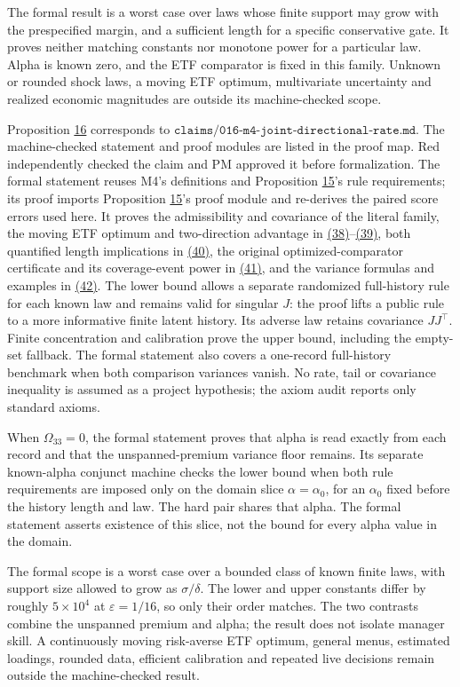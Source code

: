 \documentclass[11pt]{article}
\begin{document}
The formal result is a worst case over laws whose finite
support may grow with the prespecified margin, and a sufficient
length for a specific conservative gate. It proves neither
matching constants nor monotone power for a particular law.
Alpha is known zero, and the ETF comparator is fixed in this
family. Unknown or rounded shock laws, a moving ETF optimum,
multivariate uncertainty and realized economic magnitudes are
outside its machine-checked scope.

Proposition \hyperref[res:Proposition-16]{16} corresponds to
\(\texttt{claims/016-m4-joint-directional-rate.md}\).
The machine-checked statement and proof modules are listed in
the proof map. Red independently checked the claim and PM
approved it before formalization. The formal statement reuses
M4's definitions and Proposition \hyperref[res:Proposition-15]{15}'s rule requirements;
its proof imports Proposition \hyperref[res:Proposition-15]{15}'s proof module and
re-derives the paired score errors used here. It proves the
admissibility and covariance of the literal family, the
moving ETF optimum and two-direction advantage in \hyperref[eq:38]{(38)}--\hyperref[eq:39]{(39)},
both quantified length implications in \hyperref[eq:40]{(40)}, the original
optimized-comparator certificate and its coverage-event power
in \hyperref[eq:41]{(41)}, and the variance formulas and examples in \hyperref[eq:42]{(42)}.
The lower bound allows a separate randomized full-history
rule for each known law and remains valid for singular
\(J\): the proof lifts a public rule to a more informative
finite latent history. Its adverse law retains covariance
\(JJ^\top\). Finite concentration and calibration prove the
upper bound, including the empty-set fallback. The formal
statement also covers a one-record full-history benchmark
when both comparison variances vanish. No rate, tail or
covariance inequality is assumed as a project hypothesis;
the axiom audit reports only standard axioms.

When \(\Omega_{33}=0\), the formal statement proves that
alpha is read exactly from each record and that the
unspanned-premium variance floor remains. Its separate
known-alpha conjunct machine checks the lower bound when
both rule requirements are imposed only on the domain slice
\(\alpha=\alpha_0\), for an \(\alpha_0\) fixed before the
history length and law. The hard pair shares that alpha.
The formal statement asserts existence of this slice, not
the bound for every alpha value in the domain.

The formal scope is a worst case over a bounded class of
known finite laws, with support size allowed to grow as
\(\sigma/\delta\). The lower and upper constants differ by
roughly \(5\times10^4\) at \(\varepsilon=1/16\), so only
their order matches. The two contrasts combine the
unspanned premium and alpha; the result does not isolate
manager skill. A continuously moving risk-averse ETF
optimum, general menus, estimated loadings, rounded data,
efficient calibration and repeated live decisions remain
outside the machine-checked result.
\end{document}
